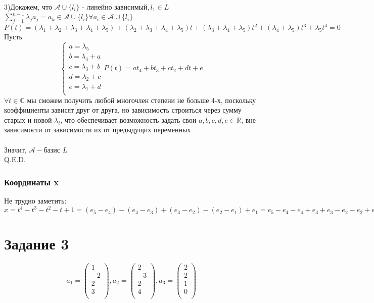 \documentclass{article}
\begin{document}
    3)Докажем, что $\mathcal{A} \cup \{l_i\} \text{ - линейно зависимый}, l_1 \in L$ \iff \exists $\sum\limits_{j=1}^{n-1} \lambda_j a_j = a_k \in \mathcal{A} \cup \{l_i\} \forall a_i \in \mathcal{A} \cup \{l_i\}$ \\
    $P(t) = (\lambda_1 + \lambda_2 + \lambda_3 + \lambda_4 + \lambda_5) + (\lambda_2 + \lambda_3 + \lambda_4 + \lambda_5)t + (\lambda_3 + \lambda_4 + \lambda_5)t^2 + (\lambda_4 + \lambda_5)t^3 + \lambda_5 t^4 = 0$ \\
    Пусть 
    \[
    \begin{cases}
        a = \lambda_5 \\
        b = \lambda_4 + a \\
        c = \lambda_3 + b \\
        d = \lambda_2 + c \\
        e = \lambda_1 + d \\
    \end{cases}
    P(t) = at_4 + bt_3 + ct_2 +dt + e
    \]
    $\forall t \in \mathbb{C}$ мы сможем получить любой многочлен степени не больше 4-х, поскольку коэффициенты зависят друг от друга, но зависимость строиться через сумму старых и новой $\lambda_i$, что обеспечивает возможность задать свои $a, b, c, d, e \in \mathbb{R}$, вне зависимости от зависимости их от предыдущих переменных \\
    \\
    Значит, $\mathcal{A} - \text{базис } L$ \\
    Q.E.D.
    
    \subsubsection{Координаты x}
    Не трудно заметить: \\
    $x =
    t^4 - t^3 - t^2 - t + 1 = 
    (e_5 - e_4) - (e_4 - e_3) + (e_3 - e_2) - (e_2 - e_1) + e_1 =
    e_5 - e_4 - e_4 + e_3 + e_3 - e_2 - e_2 + e_1 + e_1 = 
    e_5 - 2e_4 + 2e_3 - 2e_2 + 2e_1 $ \\    
    

\newpage
    \section{Задание 3}
    \[a_1 = 
    \begin{pmatrix}
        1 \\
        -2 \\
        2 \\
        3 \\
    \end{pmatrix}, 
    a_2 = 
    \begin{pmatrix}
        2 \\
        -3 \\
        2 \\
        4 \\
    \end{pmatrix}, 
    a_3 = 
    \begin{pmatrix}
        2 \\
        2 \\
        1 \\
        0 \\
    \end{pmatrix}
    \]
\end{document}
